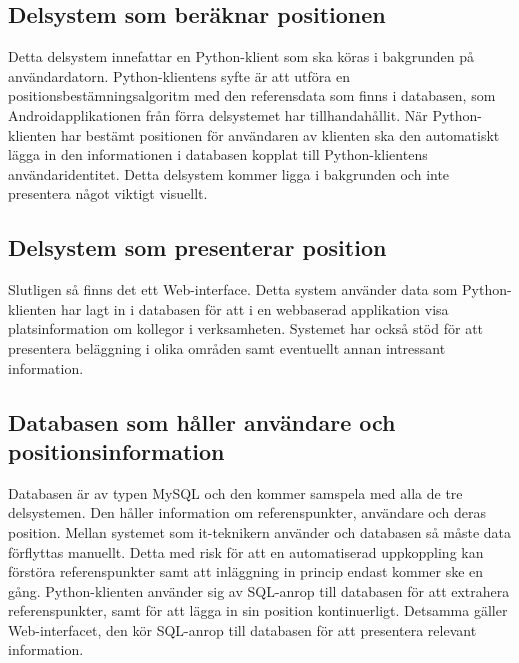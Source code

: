 \documentclass[swedish, a4paper,12pt]{article}
\begin{document}
\subsection{Delsystem som beräknar positionen}
Detta delsystem innefattar en Python-klient som ska köras i bakgrunden på användardatorn.
Python-klientens syfte är att utföra en positionsbestämningsalgoritm med den referensdata som finns i databasen, som Androidapplikationen från förra delsystemet har tillhandahållit. När Python-klienten har bestämt positionen för användaren av klienten ska den automatiskt lägga in den informationen i databasen kopplat till Python-klientens användaridentitet. Detta delsystem kommer ligga i bakgrunden och inte presentera något viktigt visuellt.

\subsection{Delsystem som presenterar position}
Slutligen så finns det ett Web-interface. Detta system använder data som Python-klienten har lagt in i databasen för att i en webbaserad applikation visa platsinformation om kollegor i verksamheten. Systemet har också stöd för att presentera beläggning i olika områden samt eventuellt annan intressant information.

\subsection{Databasen som håller användare och positionsinformation}
Databasen är av typen MySQL och den kommer samspela med alla de tre delsystemen. Den håller information om referenspunkter, användare och deras position.
Mellan systemet som it-teknikern använder och databasen så måste data förflyttas manuellt. Detta med risk för att en automatiserad uppkoppling kan förstöra referenspunkter samt att inläggning in princip endast kommer ske en gång. Python-klienten använder sig av SQL-anrop till databasen för att extrahera referenspunkter, samt för att lägga in sin position kontinuerligt. Detsamma gäller Web-interfacet, den kör SQL-anrop till databasen för att presentera relevant information.
\end{document}

